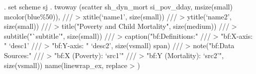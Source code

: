 . set scheme sj
{\smallskip}
. twoway (scatter sh_dyn_mort si_pov_dday, msize(small) mcolor(blue\%50)), ///
>     xtitle(`name1', size(small)) ///
>     ytitle(`name2', size(small)) ///
>     title("Poverty and Child Mortality", size(medium)) ///
>     subtitle("`subtitle'", size(small)) ///
>     caption("{\lbr}bf:Definitions:{\rbr}" ///
>             "{\lbr}bf:X-axis:{\rbr} " `desc1' ///
>             "{\lbr}bf:Y-axis:{\rbr} " `desc2', size(vsmall) span) ///
>     note("{\lbr}bf:Data Sources:{\rbr}" ///
>          "{\lbr}bf:X (Poverty):{\rbr} `src1'" ///
>          "{\lbr}bf:Y (Mortality):{\rbr} `src2'", size(vsmall)) name(linewrap_ex, replace
> )
